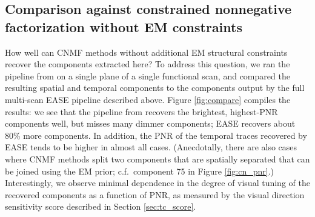\documentclass[10pt,letterpaper]{article}
\begin{document}
{\subsection{Comparison against constrained nonnegative factorization without EM constraints}
\label{sec:compare}

How well can CNMF methods without additional EM structural constraints recover the components extracted here?  To address this question, we ran the pipeline from \citep{Buchanan2018} on a single plane of a single functional scan, and compared the resulting spatial and temporal components to the components output by the full multi-scan EASE pipeline described above.  Figure \ref{fig:compare} compiles the results: we see that the pipeline from \citep{Buchanan2018} recovers the brightest, highest-PNR components well, but misses many dimmer components; EASE recovers about 80\% more components.  In addition, the PNR of the temporal traces recovered by EASE tends to be higher in almost all cases.  (Anecdotally, there are also cases where CNMF methods split two components that are spatially separated that can be joined using the EM prior; c.f.\ component 75 in Figure \ref{fig:cn_pnr}.)  Interestingly, we observe minimal dependence in the degree of visual tuning of the recovered components as a function of PNR, as measured by the visual direction sensitivity score described in Section \ref{sec:tc_score}.





}
\end{document}
